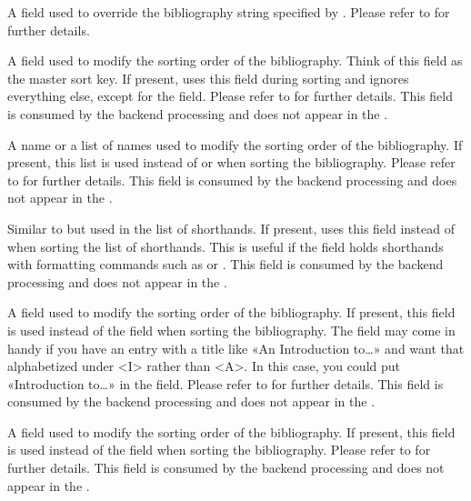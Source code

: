 \documentclass{ltxdockit}[2011/03/25]
\begin{document}
\begin{fieldlist}

A field used to override the bibliography string specified by . Please refer to  for further details.


A field used to modify the sorting order of the bibliography. Think of this field as the master sort key. If present,  uses this field during sorting and ignores everything else, except for the  field. Please refer to  for further details. This field is consumed by the backend processing and does not appear in the .


A name or a list of names used to modify the sorting order of the bibliography. If present, this list is used instead of  or  when sorting the bibliography. Please refer to  for further details. This field is consumed by the backend processing and does not appear in the .


Similar to  but used in the list of shorthands. If present,  uses this field instead of  when sorting the list of shorthands. This is useful if the  field holds shorthands with formatting commands such as  or . This field is consumed by the backend processing and does not appear in the .


A field used to modify the sorting order of the bibliography. If present, this field is used instead of the  field when sorting the bibliography. The  field may come in handy if you have an entry with a title like «An Introduction to\dots» and want that alphabetized under <I> rather than <A>. In this case, you could put «Introduction to\dots» in the  field. Please refer to  for further details. This field is consumed by the backend processing and does not appear in the .


A field used to modify the sorting order of the bibliography. If present, this field is used instead of the  field when sorting the bibliography. Please refer to  for further details. This field is consumed by the backend processing and does not appear in the .


\end{fieldlist}
\end{document}
